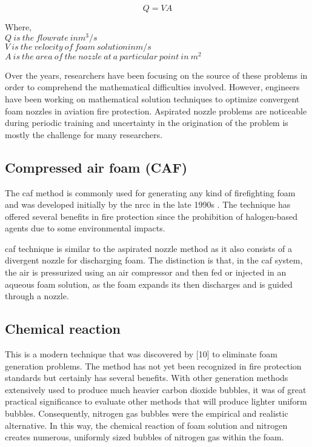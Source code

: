 \begin{equation}
    Q = VA
\end{equation}

\begin{doublespace}
    Where, \\
    $Q\ is\ the\ flowrate\ in m^3/s$ \\
    $V\ is\ the\ velocity\ of\ foam\ solution in m/s$ \\
    $A\ is\ the\ area\ of\ the\ nozzle\ at\ a\ particular\ point\ in\ m^2$ \\
\end{doublespace}

Over the years, researchers have been focusing on the source of these problems in order to comprehend the mathematical difficulties involved. However, engineers have been working on mathematical solution techniques to optimize convergent foam nozzles in aviation fire protection. Aspirated nozzle problems are noticeable during periodic training and uncertainty in the origination of the problem is mostly the challenge for many researchers.

\subsection{Compressed air foam (CAF)}
The \acrshort{caf} method is commonly used for generating any kind of firefighting foam and was developed initially by the \Acrfull{nrcc} in the late 1990s \cite{rie2016class}. The technique has offered several benefits in fire protection since the prohibition of halogen-based agents due to some environmental impacts.   

\acrshort{caf} technique is similar to the aspirated nozzle method as it also consists of a divergent nozzle for discharging foam. The distinction is that, in the \acrshort{caf} system, the air is pressurized using an air compressor and then fed or injected in an aqueous foam solution, as the foam expands its then discharges and is guided through a nozzle.

\subsection{Chemical reaction}
This is a modern technique that was discovered by [10] to eliminate foam generation problems. The method has not yet been recognized in fire protection standards but certainly has several benefits. With other generation methods extensively used to produce much heavier carbon dioxide bubbles, it was of great practical significance to evaluate other methods that will produce lighter uniform bubbles. Consequently, nitrogen gas bubbles were the empirical and realistic alternative. In this way, the chemical reaction of foam solution and nitrogen creates numerous, uniformly sized bubbles of nitrogen gas within the foam.

